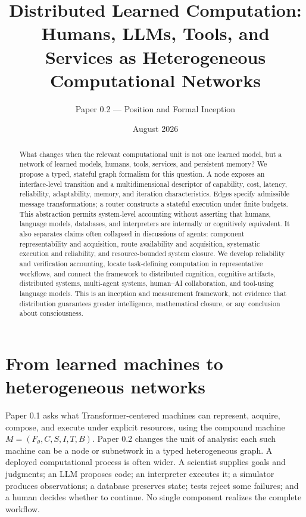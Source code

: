 \documentclass[10pt]{article}
\title{Distributed Learned Computation:\\Humans, LLMs, Tools, and Services as Heterogeneous Computational Networks}
\author{Paper 0.2 --- Position and Formal Inception}
\date{August 2026}
\begin{document}
\maketitle

\begin{abstract}
What changes when the relevant computational unit is not one learned model, but a network of learned models, humans, tools, services, and persistent memory? We propose a typed, stateful graph formalism for this question. A node exposes an interface-level transition and a multidimensional descriptor of capability, cost, latency, reliability, adaptability, memory, and iteration characteristics. Edges specify admissible message transformations; a router constructs a stateful execution under finite budgets. This abstraction permits system-level accounting without asserting that humans, language models, databases, and interpreters are internally or cognitively equivalent. It also separates claims often collapsed in discussions of agents: component representability and acquisition, route availability and acquisition, systematic execution and reliability, and resource-bounded system closure. We develop reliability and verification accounting, locate task-defining computation in representative workflows, and connect the framework to distributed cognition, cognitive artifacts, distributed systems, multi-agent systems, human--AI collaboration, and tool-using language models. This is an inception and measurement framework, not evidence that distribution guarantees greater intelligence, mathematical closure, or any conclusion about consciousness.
\end{abstract}

\section{From learned machines to heterogeneous networks}

Paper 0.1 asks what Transformer-centered machines can represent, acquire, compose, and execute under explicit resources, using the compound machine $M=(F_\theta,C,S,I,T,B)$. Paper 0.2 changes the unit of analysis: each such machine can be a node or subnetwork in a typed heterogeneous graph. A deployed computational process is often wider. A scientist supplies goals and judgments; an LLM proposes code; an interpreter executes it; a simulator produces observations; a database preserves state; tests reject some failures; and a human decides whether to continue. No single component realizes the complete workflow.
\end{document}
